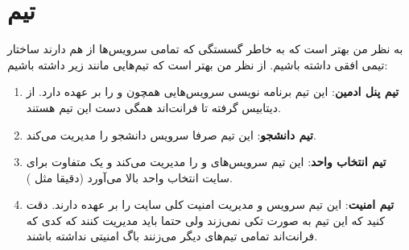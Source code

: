 \section{تیم}
به نظر من بهتر است که به خاطر گسستگی که تمامی سرویس‌ها از هم دارند ساختار تیمی افقی داشته باشیم.
از نظر من بهتر است که تیم‌هایی مانند زیر داشته باشیم:
\begin{enumerate}
    \item \textbf{تیم پنل ادمین}: این تیم برنامه نویسی سرویس‌هایی همچون  و  را بر عهده دارد. از دیتابیس گرفته تا فرانت‌اند همگی دست این تیم هستند.
    \item \textbf{تیم دانشجو}: این تیم صرفا سرویس دانشجو را مدیریت می‌کند.
    \item \textbf{تیم انتخاب واحد}: این تیم سرویس‌های  و  را مدیریت می‌کند و یک  متفاوت برای سایت انتخاب واحد بالا می‌آورد (دقیقا مثل ).
    \item \textbf{تیم امنیت}:‌ این تیم سرویس  و مدیریت امنیت کلی سایت را بر عهده دارند. دقت کنید که این تیم به صورت تکی  نمی‌زند ولی حتما باید مدیریت کنند که کدی که فرانت‌اند تمامی تیم‌های دیگر می‌زنند باگ امنیتی نداشته باشند.
\end{enumerate}